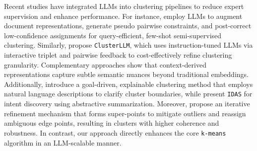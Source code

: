 Recent studies have integrated LLMs into clustering pipelines to reduce expert supervision and enhance performance. For instance, \citet{viswanathan2024large} employ LLMs to augment document representations, generate pseudo pairwise constraints, and post-correct low-confidence assignments for query-efficient, few-shot semi-supervised clustering. Similarly, \citet{zhang-etal-2023-clusterllm} propose \texttt{ClusterLLM}, which uses instruction-tuned LLMs via interactive triplet and pairwise feedback to cost-effectively refine clustering granularity. Complementary approaches \citep{tipirneni2024context, PETUKHOVA2025100} show that context-derived representations capture subtle semantic nuances beyond traditional embeddings. Additionally, \citet{wang2023goal} introduce a goal-driven, explainable clustering method that employs natural language descriptions to clarify cluster boundaries, while \citet{de2023idas} present \texttt{IDAS} for intent discovery using abstractive summarization. Moreover, \citet{feng2024llmedgerefine} propose an iterative refinement mechanism that forms super-points to mitigate outliers and reassign ambiguous edge points, resulting in clusters with higher coherence and robustness. In contrast, our approach directly enhances the core \texttt{k-means} algorithm in an LLM-scalable manner.
